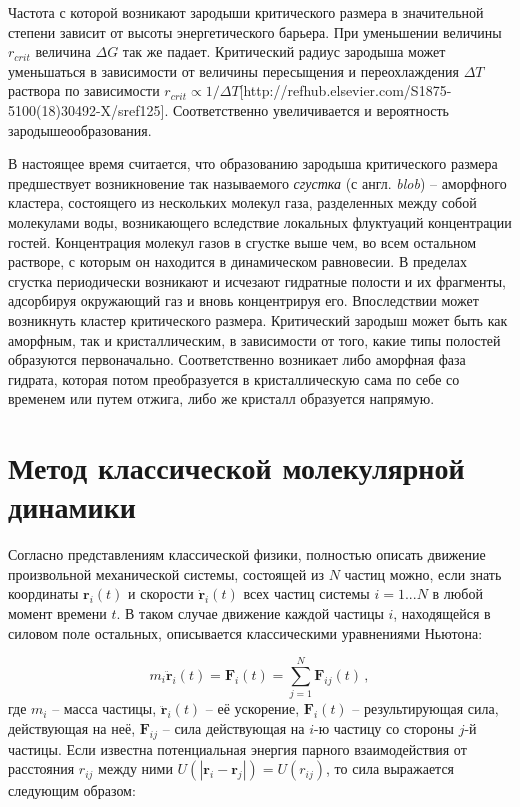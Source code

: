 Частота с которой возникают зародыши критического размера в значительной степени зависит от высоты энергетического барьера. При уменьшении величины $r_{crit}$ величина $\Delta G$ так же падает. Критический радиус зародыша может уменьшаться в зависимости от величины пересыщения и переохлаждения $\Delta T$ раствора по зависимости $r_{crit} \propto 1/\Delta T$[http://refhub.elsevier.com/S1875-5100(18)30492-X/sref125]. Соответственно увеличивается и вероятность зародышеообразования. 

В настоящее время считается, что образованию зародыша критического размера предшествует возникновение так называемого \textit{сгустка} (с англ. \textit{blob}) -- аморфного кластера, состоящего из нескольких молекул газа, разделенных между собой молекулами воды, возникающего вследствие локальных флуктуаций концентрации гостей. Концентрация молекул газов в сгустке выше чем, во всем остальном растворе, с которым он находится в динамическом равновесии. В пределах сгустка периодически возникают и исчезают гидратные полости и их фрагменты, адсорбируя окружающий газ и вновь концентрируя его. Впоследствии может возникнуть кластер критического размера. Критический зародыш может быть как аморфным, так и кристаллическим, в зависимости от того, какие типы полостей образуются первоначально. Соответственно возникает либо аморфная фаза гидрата, которая потом преобразуется в кристаллическую сама по себе со временем или путем отжига, либо же кристалл образуется напрямую.

\section{Метод классической молекулярной динамики}
\par Согласно представлениям классической физики, полностью описать движение произвольной механической системы, состоящей из $N$ частиц можно, если знать координаты $\mathbf{r}_i(t)$ и скорости $\mathbf{\dot{r}}_i(t)$ всех частиц системы $i=1...N$ в любой момент времени $t$. В таком случае движение каждой частицы $i$, находящейся в силовом поле остальных, описывается классическими уравнениями Ньютона:

\begin{equation}
    m_i \mathbf{\ddot{r}}_i(t) = \mathbf{F}_i(t) = \sum\limits_{j=1}^{N} \mathbf{F}_{ij}(t)\,,
    \label{eq1.4.1}
\end{equation}
где $m_i$ -- масса частицы, $\mathbf{\ddot{r}}_i(t)$ -- её ускорение, $\mathbf{F}_i(t)$ -- результирующая сила, действующая на неё, $\mathbf{F}_{ij}$ -- сила действующая на $i$-ю частицу со стороны $j$-й частицы. Если известна потенциальная энергия парного взаимодействия от расстояния $r_{ij}$ между ними $U(|\mathbf{r}_i-\mathbf{r}_j|) = U(r_{ij})$, то сила выражается следующим образом:

